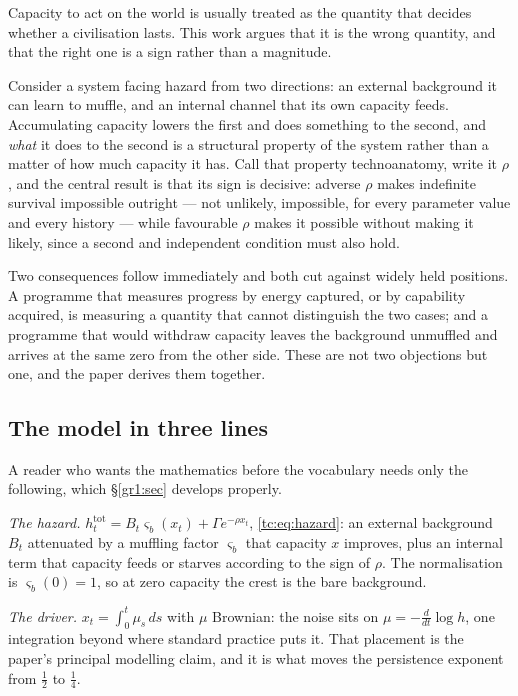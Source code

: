 \documentclass[11pt]{article}
\numberwithin{equation}{section}
\theoremstyle{plain}
\theoremstyle{definition}
\theoremstyle{remark}
\begin{document}
Capacity to act on the world is usually treated as the quantity that
decides whether a civilisation lasts. This work argues that it is the
wrong quantity, and that the right one is a sign rather than a magnitude.

Consider a system facing hazard from two directions: an external
background it can learn to muffle, and an internal channel that its own
capacity feeds. Accumulating capacity lowers the first and does something
to the second, and \emph{what} it does to the second is a structural
property of the system rather than a matter of how much capacity it has.
Call that property technoanatomy, write it $\rho$, and the central result
is that its sign is decisive: adverse $\rho$ makes indefinite survival
impossible outright --- not unlikely, impossible, for every parameter
value and every history --- while favourable $\rho$ makes it possible
without making it likely, since a second and independent condition must
also hold.

Two consequences follow immediately and both cut against widely held
positions. A programme that measures progress by energy captured, or by
capability acquired, is measuring a quantity that cannot distinguish the
two cases; and a programme that would withdraw capacity leaves the
background unmuffled and arrives at the same zero from the other side.
These are not two objections but one, and the paper derives them
together.

\subsection{The model in three lines}\label{intro:sub:model}

A reader who wants the mathematics before the vocabulary needs only the
following, which \S\ref{gr1:sec} develops properly.

\emph{The hazard.} $h^{\mathrm{tot}}_t=B_t\varsigma_b(x_t)+\Gamma
e^{-\rho x_t}$, \eqref{tc:eq:hazard}: an external background $B_t$
attenuated by a muffling factor $\varsigma_b$ that capacity $x$ improves,
plus an internal term that capacity feeds or starves according to the
sign of $\rho$. The normalisation is $\varsigma_b(0)=1$, so at zero
capacity the crest is the bare background.

\emph{The driver.} $x_t=\int_0^t\mu_s\,ds$ with $\mu$ Brownian: the noise
sits on $\mu=-\tfrac{d}{dt}\log h$, one integration beyond where standard
practice puts it. That placement is the paper's principal modelling
claim, and it is what moves the persistence exponent from $\tfrac12$ to
$\tfrac14$.
\end{document}

